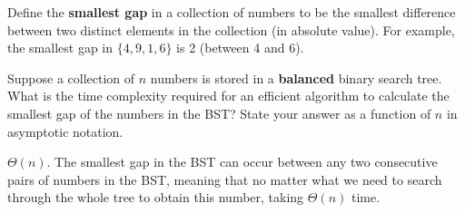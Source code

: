 \begin{prob}
    Define the \textbf{smallest gap} in a collection of numbers to be the smallest difference
    between two distinct elements in the collection (in absolute value).
    For example, the smallest gap in $\{4, 9, 1, 6\}$ is 2 (between 4 and 6).

    Suppose a collection of $n$ numbers is stored in a \textbf{balanced} binary search
    tree. 
    What is the time complexity required for an efficient algorithm to calculate
    the smallest gap of the numbers in the BST? State your answer as a function of $n$ in
    asymptotic notation.

    \begin{soln}
        $\Theta(n)$. The smallest gap in the BST can occur between any two consecutive pairs of numbers 
        in the BST, meaning that no matter what we need to search through the whole tree to obtain this 
        number, taking $\Theta(n)$ time.
    \end{soln}

\end{prob}
